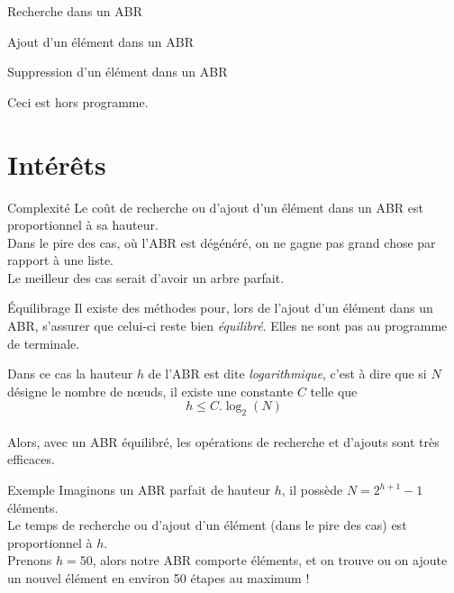 \documentclass[10pt]{beamer}
\begin{document}
\begin{frame}{Recherche dans un ABR}
    \begin{center}
    \end{center}
\end{frame}
\begin{frame}{Ajout d'un élément dans un ABR}
    \begin{center}
    \end{center}
\end{frame}

\begin{frame}{Suppression d'un élément dans un ABR}
    \begin{center}
    \end{center}

    \alert{Ceci est hors programme.}
\end{frame}
\section*{Intérêts}
\begin{frame}{Complexité}
Le coût de recherche ou d'ajout d'un élément dans un ABR est proportionnel à sa hauteur.\\

Dans le pire des cas, où l'ABR est dégénéré, on ne gagne pas grand chose par rapport à une liste.\\

Le meilleur des cas serait d'avoir un arbre parfait.\\
\end{frame}
\begin{frame}{\'Equilibrage}
Il existe des méthodes pour, lors de l'ajout  d'un élément dans un ABR, s'assurer que celui-ci reste bien \textit{équilibré}. Elles ne sont pas au programme de terminale.

Dans ce cas la hauteur $h$ de l'ABR est dite \textit{logarithmique}, c'est à dire que si $N$ désigne le nombre de n\oe uds, il existe une constante $C$ telle que $$h\leqslant C.\log_2(N)$$\\

Alors, avec un ABR équilibré, les opérations de recherche et d'ajouts sont très efficaces.
\end{frame}
\begin{frame}{Exemple}
Imaginons un ABR parfait de hauteur $h$, il possède $N=2^{h+1}-1$ éléments.\\
Le temps de recherche ou d'ajout d'un élément (dans le pire des cas) est proportionnel à $h$.\\

Prenons $h=50$, alors notre ABR comporte  éléments, et on trouve ou on ajoute un nouvel élément en environ 50 étapes au maximum !
\end{frame}
\end{document}
